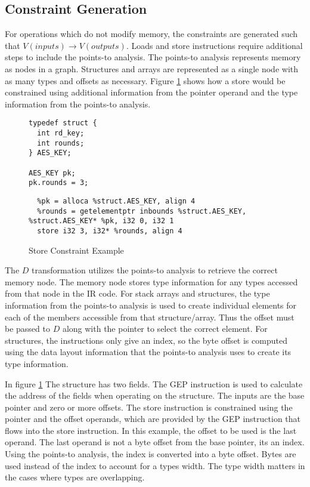 \subsection{Constraint Generation}

For operations which do not modify memory, the constraints are generated such
that $V(inputs) \rightarrow V(outputs)$. Loads and store instructions require
additional steps to include the points-to analysis. The points-to analysis
represents memory as nodes in a graph. Structures and arrays are represented as
a single node with as many types and offsets as necessary. Figure
\ref{fig:storeconstraint} shows how a store would be constrained using
additional information from the pointer operand and the type information from
the points-to analysis.


\begin{figure}[h!]
\begin{lstlisting}
typedef struct {
  int rd_key;
  int rounds;
} AES_KEY;

AES_KEY pk;
pk.rounds = 3;
\end{lstlisting}

\begin{lstlisting}
  %pk = alloca %struct.AES_KEY, align 4
  %rounds = getelementptr inbounds %struct.AES_KEY, %struct.AES_KEY* %pk, i32 0, i32 1
  store i32 3, i32* %rounds, align 4
\end{lstlisting}
  \caption{Store Constraint Example}
  \label{fig:storeconstraint}
\end{figure}

The $D$ transformation utilizes the points-to analysis to retrieve the correct
memory node. The memory node stores type information for any types accessed from
that node in the IR code. For stack arrays and structures, the type information
from the points-to analysis is used to create individual elements for each of
the members accessible from that structure/array. Thus the offset must be passed
to $D$ along with the pointer to select the correct element. For structures, the
instructions only give an index, so the byte offset is computed using the data
layout information that the points-to analysis uses to create its type information.

In figure \ref{fig:storeconstraint} The  structure has two
fields. The GEP instruction is used to calculate the address of the fields when
operating on the structure. The inputs are the base pointer and zero or more
offsets. The store instruction is constrained using the pointer and the offset
operands, which are provided by the GEP instruction that flows into the store
instruction. In this example, the offset to be used is the last operand. The
last operand is not a byte offset from the base pointer, its an index. Using the
points-to analysis, the index is converted into a byte offset. Bytes are used
instead of the index to account for a types width. The type width matters in the
cases where types are overlapping.

